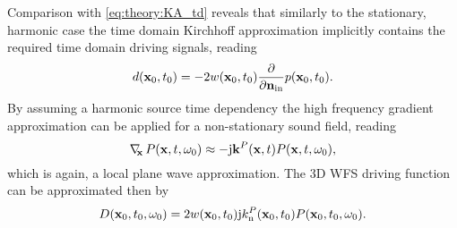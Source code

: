 Comparison with \eqref{eq:theory:KA_td} reveals that similarly to the stationary, harmonic case the time domain Kirchhoff approximation implicitly contains the required time domain driving signals, reading
\begin{equation}
\label{eq:moving_source:3D_wfs_driv_fun_td}
d(\mathbf{x}_0,t_0) =  -2 w(\mathbf{x}_0,t_0) \frac{\partial}{\partial \mathbf{n}_{\mathrm{in}}}  p(\mathbf{x}_0,t_0).
\end{equation}
By assuming a harmonic source time dependency the high frequency gradient approximation can be applied for a non-stationary sound field, reading
\begin{equation}
\nabla_{\!\!\mathbf{x}}\, P(\mathbf{x},t,\omega_0) \approx - \mathrm{j} \mathbf{k}^P(\mathbf{x},t) P(\mathbf{x},t,\omega_0),
\label{eq:moving_source:gradient_appr_nonstat}
\end{equation}
which is again, a local plane wave approximation.
The 3D WFS driving function can be approximated then by 
\begin{equation}
\label{eq:moving_source:3D_wfs_driv_fun}
D(\mathbf{x}_0,t_0,\omega_0) =  2 w(\mathbf{x}_0,t_0) \mathrm{j} k_{\mathrm{n}}^P(\mathbf{x}_0,t_0) P(\mathbf{x}_0,t_0,\omega_0).
\end{equation}
	
